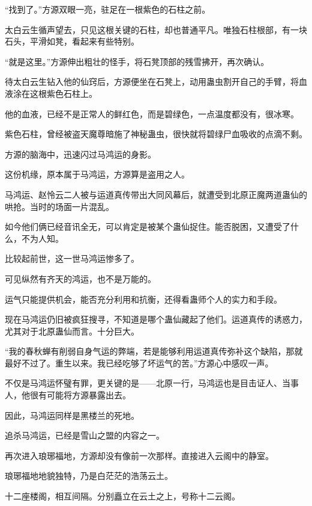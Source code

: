 
\begin{this_body}



“找到了。”方源双眼一亮，驻足在一根紫色的石柱之前。

太白云生循声望去，只见这根关键的石柱，却也普通平凡。唯独石柱根部，有一块石头，平滑如凳，看起来有些特别。

“就是这里。”方源伸出粗壮的怪手，将石凳顶部的残雪拂开，再次确认。

待太白云生钻入他的仙窍后，方源便坐在石凳上，动用蛊虫割开自己的手臂，将血液涂在这根紫色石柱上。

他的血液，已经不是正常人的鲜红色，而是碧绿色，一点温度都没有，很冰寒。

紫色石柱，曾经被盗天魔尊暗施了神秘蛊虫，很快就将碧绿尸血吸收的点滴不剩。

方源的脑海中，迅速闪过马鸿运的身影。

这份机缘，原本属于马鸿运，方源算是盗用之人。

马鸿运、赵怜云二人被与运道真传带出大同风幕后，就遭受到北原正魔两道蛊仙的哄抢。当时的场面一片混乱。

如今他们俩已经音讯全无，可以肯定是被某个蛊仙捉住。能否脱困，又遭受了什么，不为人知。

比较起前世，这一世马鸿运惨多了。

可见纵然有齐天的鸿运，也不是万能的。

运气只能提供机会，能否充分利用和抗衡，还得看蛊师个人的实力和手段。

现在马鸿运仍旧被疯狂搜寻，不知道是哪个蛊仙藏起了他们。运道真传的诱惑力，尤其对于北原蛊仙而言。十分巨大。

“我的春秋蝉有削弱自身气运的弊端，若是能够利用运道真传弥补这个缺陷，那就最好不过了。重生以来。我已经吃够了坏运气的苦。”方源心中感叹一声。

不仅是马鸿运怀璧有罪，更关键的是——北原一行，马鸿运也是目击证人、当事人，他很有可能将方源暴露出去。

因此，马鸿运同样是黑楼兰的死地。

追杀马鸿运，已经是雪山之盟的内容之一。

再次进入琅琊福地，方源却没有像前一次那样。直接进入云阁中的静室。

琅琊福地地貌独特，乃是白茫茫的浩荡云土。

十二座楼阁，相互间隔。分别矗立在云土之上，号称十二云阁。


\end{this_body}
